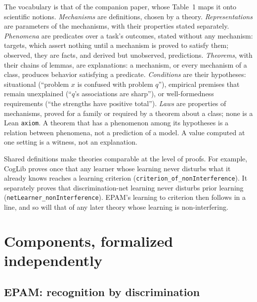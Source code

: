 \documentclass[11pt]{article}
\newcommand{\code}[1]{\texttt{#1}}
\newcommand{\lean}[1]{\texttt{#1}}
\begin{document}
The vocabulary is that of the companion paper, whose Table~1 maps it onto scientific notions. \emph{Mechanisms} are definitions, chosen by a theory. \emph{Representations} are parameters of the mechanisms, with their properties stated separately. \emph{Phenomena} are predicates over a task's outcomes, stated without any mechanism: targets, which assert nothing until a mechanism is proved to satisfy them; observed, they are facts, and derived but unobserved, predictions. \emph{Theorems}, with their chains of lemmas, are explanations: a mechanism, or every mechanism of a class, produces behavior satisfying a predicate. \emph{Conditions} are their hypotheses: situational (``problem $x$ is confused with problem $q$''), empirical premises that remain unexplained (``$q$'s associations are sharp''), or well-formedness requirements (``the strengths have positive total''). \emph{Laws} are properties of mechanisms, proved for a family or required by a theorem about a class; none is a Lean \code{axiom}. A theorem that has a phenomenon among its hypotheses is a relation between phenomena, not a prediction of a model. A value computed at one setting is a witness, not an explanation.

Shared definitions make theories comparable at the level of proofs. For example, CogLib proves once that any learner whose learning never disturbs what it already knows reaches a learning criterion (\lean{criterion\_of\_nonInterference}). It separately proves that discrimination-net learning never disturbs prior learning (\lean{netLearner\_nonInterference}). EPAM's learning to criterion then follows in a line, and so will that of any later theory whose learning is non-interfering.

\section{Components, formalized independently}
\label{sec:theories}

\subsection{EPAM: recognition by discrimination}
\end{document}
